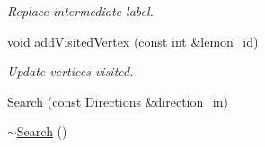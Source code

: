 \begin{DoxyCompactItemize}
\begin{DoxyCompactList}\small\item\em Replace intermediate label. \end{DoxyCompactList}\item 
void \hyperlink{classbidirectional_1_1Search_a91b68db5c76c29195db8b2e4566fc601}{add\+Visited\+Vertex} (const int \&lemon\+\_\+id)
\begin{DoxyCompactList}\small\item\em Update vertices visited. \end{DoxyCompactList}\item 
\hyperlink{classbidirectional_1_1Search_a6d5235bb92e3ca770634e5a77b55c4e4}{Search} (const \hyperlink{namespacebidirectional_a4cbe6f0bfbd3629c2cd44c98014aed70}{Directions} \&direction\+\_\+in)
\item 
\hyperlink{classbidirectional_1_1Search_a4a361bd0416ed0208792b19fabc4e749}{$\sim$\+Search} ()
\end{DoxyCompactItemize}
